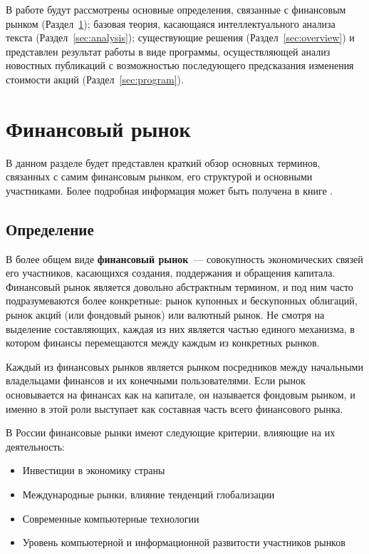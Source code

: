 \documentclass[14pt]{matmex-diploma-custom}
\begin{document}
В работе будут рассмотрены основные определения, связанные с финансовым рынком (Раздел~\ref{sec:finance}); базовая теория, касающаяся интеллектуального анализа текста (Раздел~\ref{sec:analysis}); существующие решения (Раздел~\ref{sec:overview}) и представлен результат работы в виде программы, осуществляющей анализ новостных публикаций с возможностью последующего предсказания изменения стоимости акций (Раздел~\ref{sec:program}).

\clearpage\section{Финансовый рынок}

\label{sec:finance}

В данном разделе будет представлен краткий обзор основных терминов, связанных с самим финансовым рынком, его структурой и основными участниками. Более подробная информация может быть получена в книге \cite{book:financial_market}.

\subsection{Определение}

В более общем виде \textbf{финансовый рынок}~--- совокупность экономических связей его участников, касающихся создания, поддержания и обращения капитала. Финансовый рынок является довольно абстрактным термином, и под ним часто подразумеваются более конкретные: рынок купонных и бескупонных облигаций, рынок акций (или фондовый рынок) или валютный рынок. Не смотря на выделение составляющих, каждая из них является частью единого механизма, в котором финансы перемещаются между каждым из конкретных рынков.

Каждый из финансовых рынков является рынком посредников между начальными владельцами финансов и их конечными пользователями. Если рынок основывается на финансах как на капитале, он называется фондовым рынком, и именно в этой роли выступает как составная часть всего финансового рынка.

В России финансовые рынки имеют следующие критерии, влияющие на их деятельность:

\begin{itemize}
\item Инвестиции в экономику страны
\item Международные рынки, влияние тенденций глобализации
\item Современные компьютерные технологии
\item Уровень компьютерной и информационной развитости участников рынков
\end{itemize}
\end{document}
